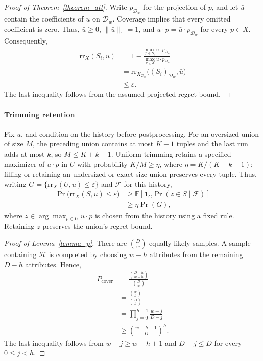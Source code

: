 \begin{proof}[Proof of Theorem~\ref{theorem_att}]
Write $p_{\mathcal{D}_w}$ for the projection of $p$, and let $\bar u$ contain the coefficients of $u$ on $\mathcal{D}_w$. Coverage implies that every omitted coefficient is zero. Thus, $\bar u\geq0$, $\lVert\bar u\rVert_1=1$, and $u\cdot p=\bar u\cdot p_{\mathcal{D}_w}$ for every $p\in X$. Consequently,
\[
\begin{aligned}
\mathrm{rr}_X(S_i,u)
&=1-\frac{\max_{p\in S_i}\bar u\cdot p_{\mathcal{D}_w}}
{\max_{p\in X}\bar u\cdot p_{\mathcal{D}_w}}\\
&=\mathrm{rr}_{X_{\mathcal{D}_w}}\bigl((S_i)_{\mathcal{D}_w},\bar u\bigr)\\
&\leq\varepsilon.
\end{aligned}
\]
The last inequality follows from the assumed projected regret bound.
\end{proof}

\paragraph{Trimming retention}
Fix $u$, and condition on the history before postprocessing. For an oversized union of size $M$, the preceding union contains at most $K-1$ tuples and the last run adds at most $k$, so $M\leq K+k-1$. Uniform trimming retains a specified maximizer of $u\cdot p$ in $U$ with probability $K/M\geq\eta$, where $\eta=K/(K+k-1)$; filling or retaining an undersized or exact-size union preserves every tuple. Thus, writing $G=\{\mathrm{rr}_X(U,u)\leq\varepsilon\}$ and $\mathcal{F}$ for this history,
\[
\begin{aligned}
\Pr\bigl(\mathrm{rr}_X(S,u)\leq\varepsilon\bigr)
&\geq\mathbb{E}\!\left[\mathbf{1}_G\Pr(z\in S\mid\mathcal{F})\right]\\
&\geq\eta\Pr(G),
\end{aligned}
\]
where $z\in\arg\max_{p\in U}u\cdot p$ is chosen from the history using a fixed rule. Retaining $z$ preserves the union's regret bound.

\begin{proof}[Proof of Lemma~\ref{lemma_p}]
There are $\binom Dw$ equally likely samples. A sample containing $\mathcal{H}$ is completed by choosing $w-h$ attributes from the remaining $D-h$ attributes. Hence,
\[
\begin{aligned}
P_\text{cover}&=\frac{\binom{D-h}{w-h}}{\binom Dw}\\
&=\frac{\binom wh}{\binom Dh}\\
&=\prod_{j=0}^{h-1}\frac{w-j}{D-j}\\
&\geq\left(\frac{w-h+1}{D}\right)^h.
\end{aligned}
\]
The last inequality follows from $w-j\geq w-h+1$ and $D-j\leq D$ for every $0\leq j<h$.
\end{proof}

